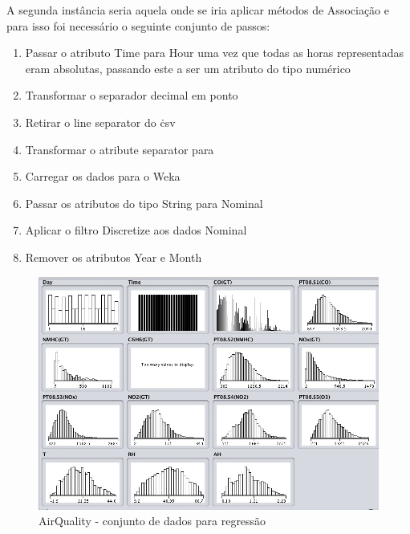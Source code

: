 A segunda instância seria aquela onde se iria aplicar métodos de Associação e para isso foi necessário o seguinte conjunto de passos:

\begin{enumerate}
	\item Passar o atributo Time para Hour uma vez que todas as horas representadas eram absolutas, passando este a ser um atributo do tipo numérico
	\item Transformar o separador decimal em ponto
	\item Retirar o line separator do \.csv
	\item Transformar o atribute separator para \,
	\item Carregar os dados para o Weka 
	\item Passar os atributos do tipo String para Nominal
	\item Aplicar o filtro Discretize aos dados Nominal
	\item Remover os atributos Year e Month
\end{enumerate}


\begin{figure}[H]
    \centering
    \includegraphics[scale=0.4]{tex/img/img2.jpg}
    \caption{AirQuality - conjunto de dados para regressão}
    \label{fig:regressao}
\end{figure}

